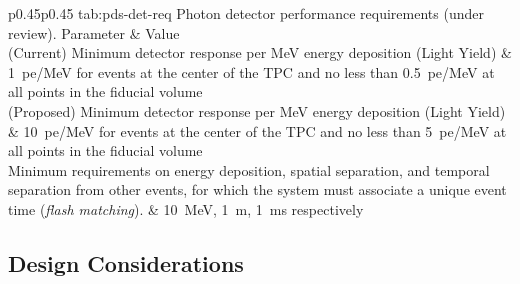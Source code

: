 \begin{dunetable}
{p{0.45\textwidth}p{0.45\textwidth}}
{tab:pds-det-req}
{Photon detector performance requirements (under review). } 
Parameter  					& Value \\ \toprowrule
(Current) Minimum detector response per MeV energy deposition (Light Yield)
  							& \SI{1}{pe/MeV} for events at the center of the TPC and no less than \SI{0.5}{pe/MeV}  at all points in the fiducial volume\\ \colhline
(Proposed) Minimum detector response per MeV energy deposition (Light Yield)
  							& \SI{10}{pe/MeV} for events at the center of the TPC and no less than \SI{5}{pe/MeV}  at all points in the fiducial volume\\ \colhline
Minimum requirements on energy deposition, spatial separation, and temporal separation from other events, for which the system must associate a unique event time ({\it flash matching}). 
							& \SI{10}{MeV}, \SI{1}{m}, \SI{1}{ms}  respectively\\
\end{dunetable}


\subsection{Design Considerations}
\label{sec:fdsp-pd-des-consid}

